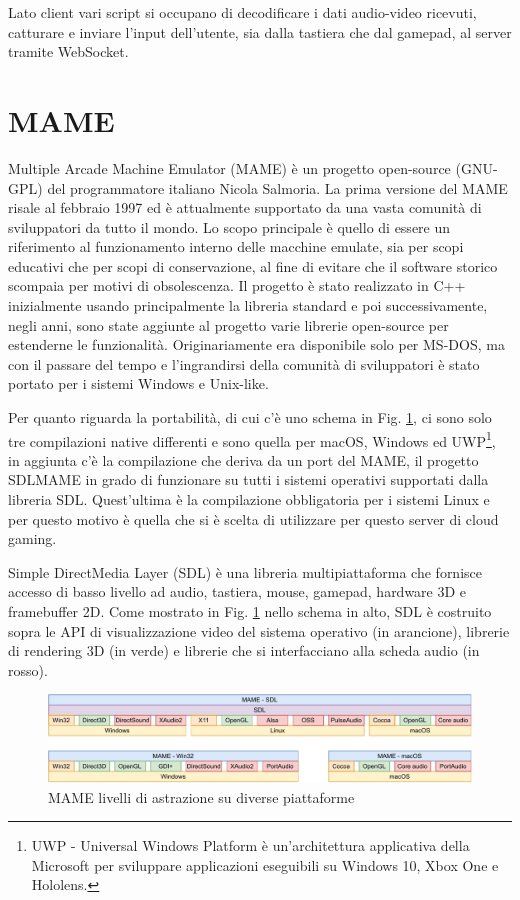 Lato client vari script si occupano di decodificare i dati audio-video ricevuti, catturare e inviare l'input dell'utente, sia dalla tastiera che dal gamepad, al server tramite WebSocket.

\section{MAME}
Multiple Arcade Machine Emulator (MAME) è un progetto open-source (GNU-GPL) del programmatore italiano Nicola Salmoria. La prima versione del MAME risale al febbraio 1997 ed è attualmente supportato da una vasta comunità di sviluppatori da tutto il mondo. Lo scopo principale è quello di essere un riferimento al funzionamento interno delle macchine emulate, sia per scopi educativi che per scopi di conservazione, al fine di evitare che il software storico scompaia per motivi di obsolescenza. Il progetto è stato realizzato in C++ inizialmente usando principalmente la libreria standard e poi successivamente, negli anni, sono state aggiunte al progetto varie librerie open-source per estenderne le funzionalità. Originariamente era disponibile solo per MS-DOS, ma con il passare del tempo e l'ingrandirsi della comunità di sviluppatori è stato portato per i sistemi Windows e Unix-like\cite{MAME}.

Per quanto riguarda la portabilità, di cui c'è uno schema in Fig. \ref{fig:mame_architettura_full}, ci sono solo tre compilazioni native differenti e sono quella per macOS, Windows ed UWP\footnote{UWP - Universal Windows Platform è un'architettura applicativa della Microsoft per sviluppare applicazioni eseguibili su Windows 10, Xbox One e Hololens.}, in aggiunta c'è la compilazione che deriva da un port del MAME, il progetto SDLMAME in grado di funzionare su tutti i sistemi operativi supportati dalla libreria SDL. Quest'ultima è la compilazione obbligatoria per i sistemi Linux e per questo motivo è quella che si è scelta di utilizzare per questo server di cloud gaming.

Simple DirectMedia Layer (SDL) è una libreria multipiattaforma che fornisce accesso di basso livello ad audio, tastiera, mouse, gamepad, hardware 3D e framebuffer 2D. Come mostrato in Fig. \ref{fig:mame_architettura_full} nello schema in alto, SDL è costruito sopra le API di visualizzazione video del sistema operativo (in arancione), librerie di rendering 3D (in verde) e librerie che si interfacciano alla scheda audio (in rosso)\cite{SDL_Wiki}. 

\begin{figure}[H]
	\includegraphics[width=\linewidth]{immagini/mame_architettura_full}
	\caption{MAME livelli di astrazione su diverse piattaforme}
	\label{fig:mame_architettura_full}
\end{figure}

